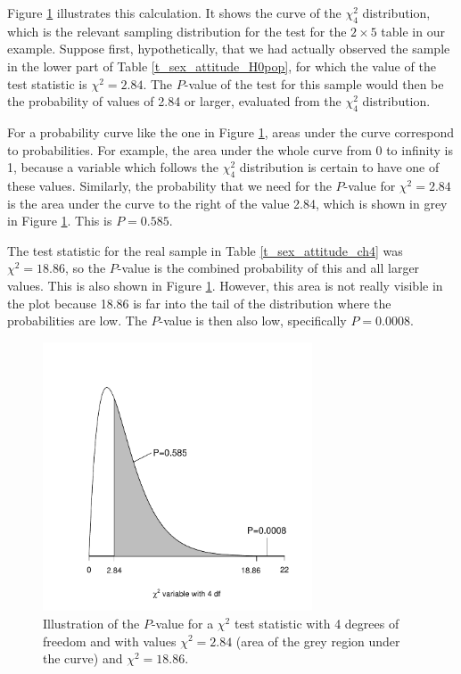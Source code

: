 Figure \ref{f_pvalchisq} illustrates this calculation. It shows the
curve of the $\chi^{2}_{4}$ distribution, which is the relevant sampling
distribution for the test for the $2\times 5$ table in our example.
Suppose first, hypothetically, that we had actually observed the sample
in the lower part of Table \ref{t_sex_attitude_H0pop}, for which the
value of the test statistic is $\chi^{2}=2.84$. The $P$-value of the
test for this sample would then be the probability of values of 2.84
or larger, evaluated from the $\chi^{2}_{4}$ distribution.

For a probability curve like the one in Figure \ref{f_pvalchisq}, areas
under the curve correspond to probabilities. For example, the area under
the whole curve from 0 to infinity is 1, because a variable which
follows the $\chi^{2}_{4}$ distribution is certain to have one of these values.
Similarly, the probability that we need for the $P$-value for
$\chi^{2}=2.84$ is the area under the curve to the right of the value
2.84, which is shown in grey in Figure \ref{f_pvalchisq}. This is
$P=0.585$.

The test statistic for the real sample in Table \ref{t_sex_attitude_ch4}
was $\chi^{2}=18.86$, so the $P$-value is the combined probability of
this and all larger values. This is also shown in Figure
\ref{f_pvalchisq}. However, this area is not really visible in the plot
because 18.86 is far into the tail of the distribution where the
probabilities are low. The $P$-value is then also low, specifically
$P=0.0008$.

\begin{figure}
\caption{Illustration of the $P$-value
for a $\chi^{2}$ test statistic with 4 degrees of freedom and with
values $\chi^{2}=2.84$  (area of the grey region under the curve) and
$\chi^{2}=18.86$.}
\label{f_pvalchisq}
\begin{center}
\includegraphics[width=8cm]{chi2_pval}
\end{center}
\vspace*{-3ex}
\end{figure}

